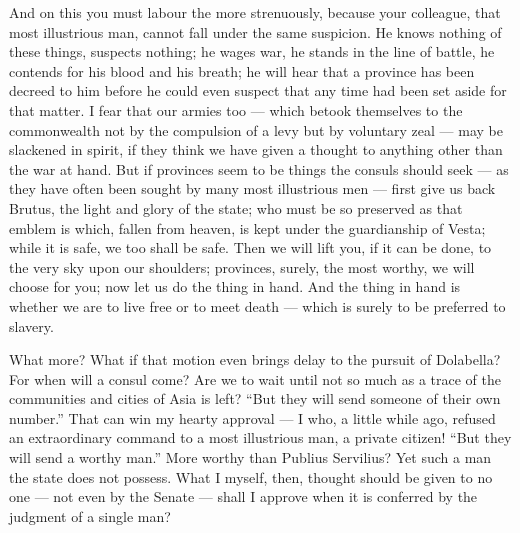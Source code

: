  And on this you must labour the more strenuously, because your colleague, that most illustrious man, cannot fall under the same suspicion. He knows nothing of these things, suspects nothing; he wages war, he stands in the line of battle, he contends for his blood and his breath; he will hear that a province has been decreed to him before he could even suspect that any time had been set aside for that matter. I fear that our armies too --- which betook themselves to the commonwealth not by the compulsion of a levy but by voluntary zeal --- may be slackened in spirit, if they think we have given a thought to anything other than the war at hand. But if provinces seem to be things the consuls should seek --- as they have often been sought by many most illustrious men --- first give us back Brutus, the light and glory of the state; who must be so preserved as that emblem is which, fallen from heaven, is kept under the guardianship of Vesta; while it is safe, we too shall be safe. Then we will lift you, if it can be done, to the very sky upon our shoulders; provinces, surely, the most worthy, we will choose for you; now let us do the thing in hand. And the thing in hand is whether we are to live free or to meet death --- which is surely to be preferred to slavery.

 What more? What if that motion even brings delay to the pursuit of Dolabella? For when will a consul come? Are we to wait until not so much as a trace of the communities and cities of Asia is left? ``But they will send someone of their own number.'' That can win my hearty approval --- I who, a little while ago, refused an extraordinary command to a most illustrious man, a private citizen! ``But they will send a worthy man.'' More worthy than Publius Servilius? Yet such a man the state does not possess. What I myself, then, thought should be given to no one --- not even by the Senate --- shall I approve when it is conferred by the judgment of a single man?

